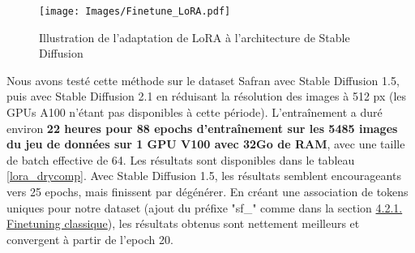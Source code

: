 \documentclass{article}
\begin{document}
\begin{figure}[H]
    \centering
    \texttt{[image: Images/Finetune\_LoRA.pdf]}
    \caption{Illustration de l'adaptation de LoRA à l'architecture de Stable Diffusion}
    \label{lora}
\end{figure}

Nous avons testé cette méthode sur le dataset Safran avec Stable Diffusion 1.5, puis avec Stable Diffusion 2.1 en réduisant la résolution des images à 512 px (les GPUs A100 n'étant pas disponibles à cette période). L'entraînement a duré environ \textbf{22 heures pour 88 epochs d'entraînement sur les 5485 images du jeu de données sur 1 GPU V100 avec 32Go de RAM}, avec une taille de batch effective de 64. Les résultats sont disponibles dans le tableau \ref{lora_drycomp}. Avec Stable Diffusion 1.5, les résultats semblent encourageants vers 25 epochs, mais finissent par dégénérer. En créant une association de tokens uniques pour notre dataset (ajout du préfixe "sf\_" comme dans la section \hyperref[sec:Finetuning_classique]{4.2.1. Finetuning classique}), les résultats obtenus sont nettement meilleurs et convergent à partir de l'epoch 20.
\end{document}
